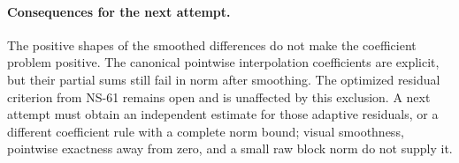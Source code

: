 \paragraph{Consequences for the next attempt.}
The positive shapes of the smoothed differences do not make the
coefficient problem positive. The canonical pointwise interpolation
coefficients are explicit, but their partial sums still fail in norm
after smoothing. The optimized residual criterion from NS-61 remains
open and is unaffected by this exclusion. A next attempt must obtain
an independent estimate for those adaptive residuals, or a different
coefficient rule with a complete norm bound; visual smoothness,
pointwise exactness away from zero, and a small raw block norm do not
supply it.
